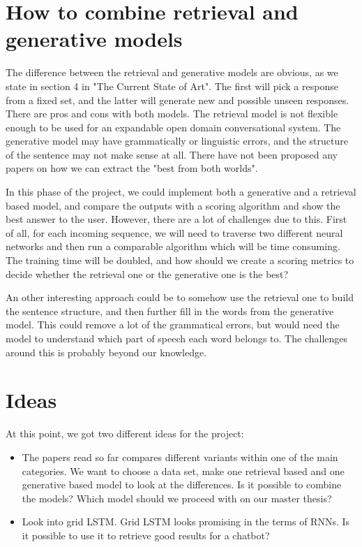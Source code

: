 \documentclass{article} %
\begin{document}
\section{How to combine retrieval and generative models}
The difference between the retrieval and generative models are obvious, as we state in section 4 in "The Current State of Art". The first will pick a response from a fixed set, and the latter will generate new and possible unseen responses. There are pros and cons with both models. The retrieval model is not flexible enough to be used for an expandable open domain conversational system. The generative model may have grammatically or linguistic errors, and the structure of the sentence may not make sense at all. There have not been proposed any papers on how we can extract the "best from both worlds". 

In this phase of the project, we could implement both a generative and a retrieval based model, and compare the outputs with a scoring algorithm and show the best answer to the user. However, there are a lot of challenges due to this. First of all, for each incoming sequence, we will need to traverse two different neural networks and then run a comparable algorithm which will be time consuming. The training time will be doubled, and how should we create a scoring metrics to decide whether the retrieval one or the generative one is the best?

An other interesting approach could be to somehow use the retrieval one to build the sentence structure, and then further fill in the words from the generative model. This could remove a lot of the grammatical errors, but would need the model to understand which part of speech each word belongs to. The challenges around this is probably beyond our knowledge.



\section{Ideas}
At this point, we got two different ideas for the project:

\begin{itemize}

\item The papers read so far compares different variants within one of the main categories. We want to choose a data set, make one retrieval based and one generative based model to look at the differences. Is it possible to combine the models? Which model should we proceed with on our master thesis? 

\item Look into grid LSTM. Grid LSTM looks promising in the terms of RNNs. Is it possible to use it to retrieve good results for a chatbot?

\end{itemize}
\end{document}
